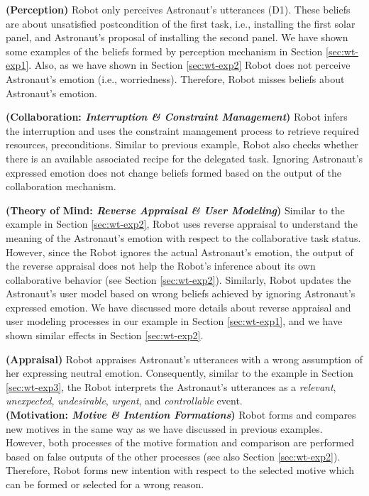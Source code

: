 \noindent\textbf{(Perception)} Robot only perceives Astronaut's utterances
(D1). These beliefs are about unsatisfied postcondition of the first task, i.e.,
installing the first solar panel, and Astronaut's proposal of installing the
second panel. We have shown some examples of the beliefs formed by perception
mechanism in Section \ref{sec:wt-exp1}. Also, as we have shown in Section
\ref{sec:wt-exp2} Robot does not perceive Astronaut's emotion (i.e.,
worriedness). Therefore, Robot misses beliefs about Astronaut's emotion.

\noindent\textbf{(Collaboration: \textit{Interruption \& Constraint
Management})} Robot infers the interruption and uses the constraint management
process to retrieve required resources, preconditions. Similar to previous
example, Robot also checks whether there is an available associated recipe for
the delegated task. Ignoring Astronaut's expressed emotion does not change
beliefs formed based on the output of the collaboration mechanism.

\noindent\textbf{(Theory of Mind: \textit{Reverse Appraisal \& User Modeling})}
Similar to the example in Section \ref{sec:wt-exp2}, Robot uses reverse
appraisal to understand the meaning of the Astronaut's emotion with respect to
the collaborative task status. However, since the Robot ignores the actual
Astronaut's emotion, the output of the reverse appraisal does not help the
Robot's inference about its own collaborative behavior (see Section
\ref{sec:wt-exp2}). Similarly, Robot updates the Astronaut's user model based on
wrong beliefs achieved by ignoring Astronaut's expressed emotion. We have
discussed more details about reverse appraisal and user modeling processes in
our example in Section \ref{sec:wt-exp1}, and we have shown similar effects
in Section \ref{sec:wt-exp2}.

\noindent\textbf{(Appraisal)} Robot appraises Astronaut's utterances with a
wrong assumption of her expressing neutral emotion. Consequently, similar to
the example in Section \ref{sec:wt-exp3}, the Robot interprets the Astronaut's
utterances as a \textit{relevant}, \textit{unexpected}, \textit{undesirable},
\textit{urgent}, and \textit{controllable} event.\\

\noindent\textbf{(Motivation: \textit{Motive \& Intention Formations})} Robot
forms and compares new motives in the same way as we have discussed in previous
examples. However, both processes of the motive formation and comparison are
performed based on false outputs of the other processes (see also Section
\ref{sec:wt-exp2}). Therefore, Robot forms new intention with respect to the
selected motive which can be formed or selected for a wrong reason.

